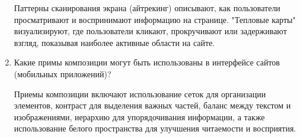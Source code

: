 \begin{enumerate}
    Паттерны сканирования экрана (айтрекинг) описывают, как пользователи просматривают и воспринимают информацию на странице. "Тепловые карты" визуализируют, где пользователи кликают, прокручивают или задерживают взгляд, показывая наиболее активные области на сайте.
    \item Какие примы композиции могут быть использованы в интерфейсе сайтов (мобильных приложений)?

    Приемы композиции включают использование сеток для организации элементов, контраст для выделения важных частей, баланс между текстом и изображениями, иерархию для упорядочивания информации, а также использование белого пространства для улучшения читаемости и восприятия.
\end{enumerate}



